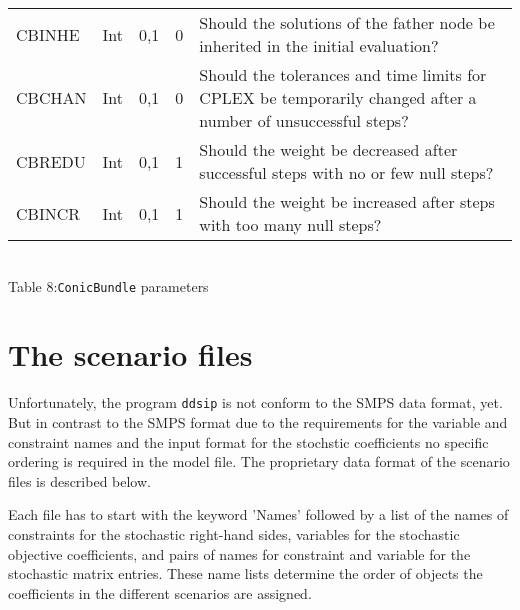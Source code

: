 \documentclass[11pt,draft]{article}
\newcommand{\+}{{\ti{+}}}
\newcommand{\1}{{\ti{1}}}
\begin{document}
\begin{center}
\begin{tabular}{|llllp{6.6cm}|}
CBINHE &Int&0,1&0&Should the solutions of the father node be inherited in the initial evaluation?\medskip\\
CBCHAN &Int&0,1&0&Should the tolerances and time limits for CPLEX be temporarily changed after a number of unsuccessful steps?\medskip\\
CBREDU &Int&0,1&1&Should the weight be decreased after successful steps with no or few null steps?\medskip\\
CBINCR &Int&0,1&1&Should the weight be increased after steps with too many null steps?\medskip\\
\hline
\end{tabular}
\\[0.5em]{Table 8:\quad \texttt{ConicBundle} parameters}
\end{center} %
%
\section{The scenario files}
Unfortunately, the program \texttt{ddsip} is not conform to the SMPS data format, yet. 
But in contrast to the SMPS format due to the requirements for the variable and constraint names and the input format for the stochstic coefficients no specific ordering is required in the model file.
The proprietary data format of the scenario files is described below.

Each file has to start with the keyword 'Names' followed by a list of the names of constraints for the stochastic right-hand sides, variables for the stochastic objective coefficients,
and pairs of names for constraint and variable for the stochastic matrix entries. These name lists determine the order of objects the coefficients in the different scenarios are
assigned.
\end{document}
